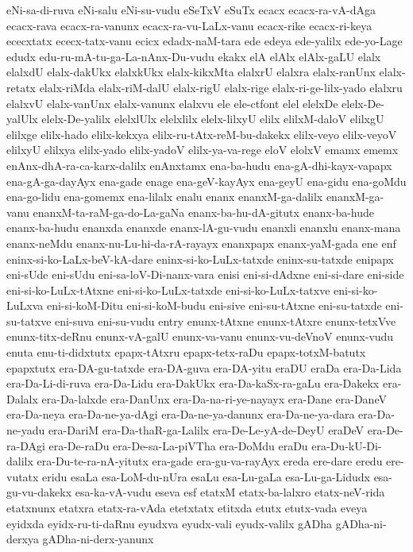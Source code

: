 {eNi-sa-di-ruva
eNi-salu
eNi-su-vudu
eSeTxV
eSuTx
ecacx
ecacx-ra-vA-dAga
ecacx-rava
ecacx-ra-vanunx
ecacx-ra-vu-LaLx-vanu
ecacx-rike
ecacx-ri-keya
ececxtatx
ececx-tatx-vanu
ecicx
edadx-naM-tara
ede
edeya
ede-yalilx
ede-yo-Lage
edudx
edu-ru-mA-tu-ga-La-nAnx-Du-vudu
ekakx
elA
elAlx
elAlx-gaLU
elalx
elalxdU
elalx-dakUkx
elalxkUkx
elalx-kikxMta
elalxrU
elalxra
elalx-ranUnx
elalx-retatx
elalx-riMda
elalx-riM-dalU
elalx-rigU
elalx-rige
elalx-ri-ge-lilx-yado
elalxru
elalxvU
elalx-vanUnx
elalx-vanunx
elalxvu
ele
ele-ctfont
elel
elelxDe
elelx-De-yalUlx
elelx-De-yalilx
elelxlUlx
elelxlilx
elelx-lilxyU
elilx
elilxM-daloV
elilxgU
elilxge
elilx-hado
elilx-kekxya
elilx-ru-tAtx-reM-bu-dakekx
elilx-veyo
elilx-veyoV
elilxyU
elilxya
elilx-yado
elilx-yadoV
elilx-ya-va-rege
eloV
elolxV
emamx
ememx
enAnx-dhA-ra-ca-karx-dalilx
enAnxtamx
ena-ba-hudu
ena-gA-dhi-kayx-vapapx
ena-gA-ga-dayAyx
ena-gade
enage
ena-geV-kayAyx
ena-geyU
ena-gidu
ena-goMdu
ena-go-lidu
ena-gomemx
ena-lilalx
enalu
enanx
enanxM-ga-dalilx
enanxM-ga-vanu
enanxM-ta-raM-ga-do-La-gaNa
enanx-ba-hu-dA-gitutx
enanx-ba-hude
enanx-ba-hudu
enanxda
enanxde
enanx-lA-gu-vudu
enanxli
enanxlu
enanx-mana
enanx-neMdu
enanx-nu-Lu-hi-da-rA-rayayx
enanxpapx
enanx-yaM-gada
ene
enf
eninx-si-ko-LaLx-beV-kA-dare
eninx-si-ko-LuLx-tatxde
eninx-su-tatxde
enipapx
eni-sUde
eni-sUdu
eni-sa-loV-Di-nanx-vara
enisi
eni-si-dAdxne
eni-si-dare
eni-side
eni-si-ko-LuLx-tAtxne
eni-si-ko-LuLx-tatxde
eni-si-ko-LuLx-tatxve
eni-si-ko-LuLxva
eni-si-koM-Ditu
eni-si-koM-budu
eni-sive
eni-su-tAtxne
eni-su-tatxde
eni-su-tatxve
eni-suva
eni-su-vudu
entry
enunx-tAtxne
enunx-tAtxre
enunx-tetxVve
enunx-titx-deRnu
enunx-vA-galU
enunx-va-vanu
enunx-vu-deVnoV
enunx-vudu
enuta
enu-ti-didxtutx
epapx-tAtxru
epapx-tetx-raDu
epapx-totxM-batutx
epapxtutx
era-DA-gu-tatxde
era-DA-guva
era-DA-yitu
eraDU
eraDa
era-Da-Lida
era-Da-Li-di-ruva
era-Da-Lidu
era-DakUkx
era-Da-kaSx-ra-gaLu
era-Dakekx
era-Dalalx
era-Da-lalxde
era-DanUnx
era-Da-na-ri-ye-nayayx
era-Dane
era-DaneV
era-Da-neya
era-Da-ne-ya-dAgi
era-Da-ne-ya-danunx
era-Da-ne-ya-dara
era-Da-ne-yadu
era-DariM
era-Da-thaR-ga-Lalilx
era-De-Le-yA-de-DeyU
eraDeV
era-De-ra-DAgi
era-De-raDu
era-De-sa-La-piVTha
era-DoMdu
eraDu
era-Du-kU-Di-dalilx
era-Du-te-ra-nA-yitutx
era-gade
era-gu-va-rayAyx
ereda
ere-dare
eredu
ere-vutatx
eridu
esaLa
esa-LoM-du-nUra
esaLu
esa-Lu-gaLa
esa-Lu-ga-Lidudx
esa-gu-vu-dakekx
esa-ka-vA-vudu
eseva
esf
etatxM
etatx-ba-lalxro
etatx-neV-rida
etatxnunx
etatxra
etatx-ra-vAda
etetxtatx
etitxda
etutx
etutx-vada
eveya
eyidxda
eyidx-ru-ti-daRnu
eyudxva
eyudx-vali
eyudx-valilx
gADha
gADha-ni-derxya
gADha-ni-derx-yanunx
}

